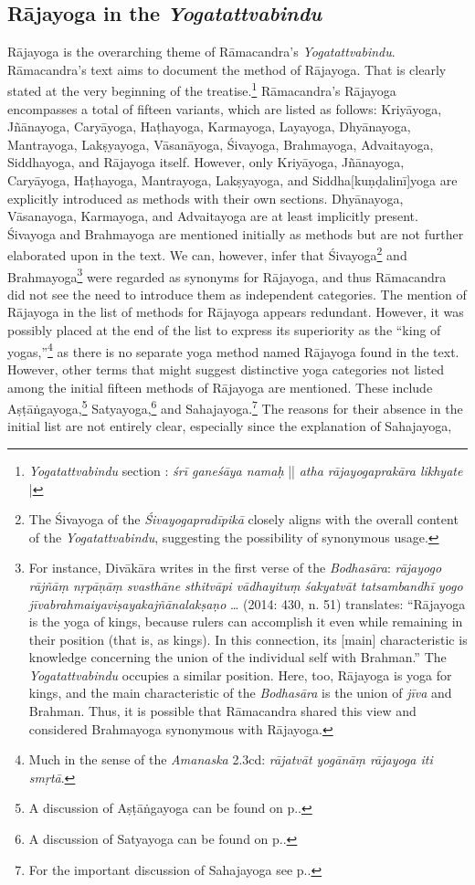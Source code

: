 \subsection{Rājayoga in the \emph{Yogatattvabindu}}

Rājayoga is the overarching theme of Rāmacandra's \emph{Yogatattvabindu}. Rāmacandra's text aims to document the method of Rājayoga. That is clearly stated at the very beginning of the treatise.\footnote{\emph{Yogatattvabindu} section : \textit{śrī ganeśāya namaḥ} || \textit{atha rājayogaprakāra likhyate} |} Rāmacandra's Rājayoga encompasses a total of fifteen variants, which are listed as follows: Kriyāyoga, Jñānayoga, Caryāyoga, Haṭhayoga, Karmayoga, Layayoga, Dhyānayoga, Mantrayoga, Lakṣyayoga, Vāsanāyoga, Śivayoga, Brahmayoga, Advaitayoga, Siddhayoga, and Rājayoga itself. However, only Kriyāyoga, Jñānayoga, Caryāyoga, Haṭhayoga, Mantrayoga, Lakṣyayoga, and Siddha[kuṇḍalinī]yoga are explicitly introduced as methods with their own sections. Dhyānayoga, Vāsanayoga, Karmayoga, and Advaitayoga are at least implicitly present. Śivayoga and Brahmayoga are mentioned initially as methods but are not further elaborated upon in the text. We can, however, infer that Śivayoga\footnote{The Śivayoga of the \textit{Śivayogapradīpikā} closely aligns with the overall content of the \textit{Yogatattvabindu}, suggesting the possibility of synonymous usage.} and Brahmayoga\footnote{For instance, Divākāra writes in the first verse of the \textit{Bodhasāra}: \textit{rājayogo rājñāṃ nṛpāṇāṃ svasthāne sthitvāpi vādhayituṃ śakyatvāt tatsambandhī yogo jīvabrahmaiyaviṣayakajñānalakṣaṇo} \ldots \citeauthor{birch2014} (2014: 430, n. 51) translates: ``Rājayoga is the yoga of kings, because rulers can accomplish it even while remaining in their position (that is, as kings). In this connection, its [main] characteristic is knowledge concerning the union of the individual self with Brahman.'' The \emph{Yogatattvabindu} occupies a similar position. Here, too, Rājayoga is yoga for kings, and the main characteristic of the \emph{Bodhasāra} is the union of \textit{jīva} and Brahman. Thus, it is possible that Rāmacandra shared this view and considered Brahmayoga synonymous with Rājayoga.} were regarded as synonyms for Rājayoga, and thus Rāmacandra did not see the need to introduce them as independent categories. The mention of Rājayoga in the list of methods for Rājayoga appears redundant. However, it was possibly placed at the end of the list to express its superiority as the ``king of yogas,''\footnote{Much in the sense of the \emph{Amanaska} 2.3cd: \textit{rājatvāt yogānāṃ rājayoga iti smṛtā}.} as there is no separate yoga method named Rājayoga found in the text. However, other terms that might suggest distinctive yoga categories not listed among the initial fifteen methods of Rājayoga are mentioned. These include Aṣṭāṅgayoga,\footnote{A discussion of Aṣṭāṅgayoga can be found on p.\pageref{ashtangayogacomplex}.} Satyayoga,\footnote{A discussion of Satyayoga can be found on p.\pageref{satyayoga}.} and Sahajayoga.\footnote{For the important discussion of Sahajayoga see p.\pageref{sahajayoga}.} The reasons for their absence in the initial list are not entirely clear, especially since the explanation of Sahajayoga, 